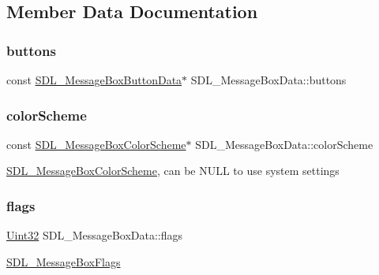 \subsection{Member Data Documentation}
\mbox{\label{struct_s_d_l___message_box_data_a265e47aab749e384661ae91d3e11e0db}} 
\subsubsection{\texorpdfstring{buttons}{buttons}}
{\footnotesize\ttfamily const \mbox{\hyperlink{struct_s_d_l___message_box_button_data}{S\+D\+L\+\_\+\+Message\+Box\+Button\+Data}}$\ast$ S\+D\+L\+\_\+\+Message\+Box\+Data\+::buttons}

\mbox{\label{struct_s_d_l___message_box_data_a18744865a3e89e260db5f01aee579e35}} 
\subsubsection{\texorpdfstring{colorScheme}{colorScheme}}
{\footnotesize\ttfamily const \mbox{\hyperlink{struct_s_d_l___message_box_color_scheme}{S\+D\+L\+\_\+\+Message\+Box\+Color\+Scheme}}$\ast$ S\+D\+L\+\_\+\+Message\+Box\+Data\+::color\+Scheme}

\mbox{\hyperlink{struct_s_d_l___message_box_color_scheme}{S\+D\+L\+\_\+\+Message\+Box\+Color\+Scheme}}, can be N\+U\+LL to use system settings \mbox{\label{struct_s_d_l___message_box_data_a113d016f760bf4e4156b0f376358d6a0}} 
\subsubsection{\texorpdfstring{flags}{flags}}
{\footnotesize\ttfamily \mbox{\hyperlink{_s_d_l__stdinc_8h_add440eff171ea5f55cb00c4a9ab8672d}{Uint32}} S\+D\+L\+\_\+\+Message\+Box\+Data\+::flags}

\mbox{\hyperlink{_s_d_l__messagebox_8h_a97f06819ac610581044fdb93d81eed37}{S\+D\+L\+\_\+\+Message\+Box\+Flags}} \mbox{\label{struct_s_d_l___message_box_data_ada6ae208a1f85adabbd7a7a08ca609c8}} 
